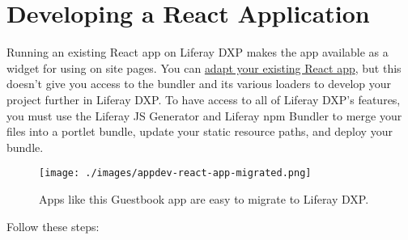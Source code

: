 \chapter{Developing a React
Application}\label{developing-a-react-application}

Running an existing React app on Liferay DXP makes the app available as
a widget for using on site pages. You can
\href{/docs/7-2/reference/-/knowledge_base/r/adapting-existing-apps-to-run-on-product}{adapt
your existing React app}, but this doesn't give you access to the
bundler and its various loaders to develop your project further in
Liferay DXP. To have access to all of Liferay DXP's features, you must
use the Liferay JS Generator and Liferay npm Bundler to merge your files
into a portlet bundle, update your static resource paths, and deploy
your bundle.

\begin{figure}
\centering
\texttt{[image: ./images/appdev-react-app-migrated.png]}
\caption{Apps like this Guestbook app are easy to migrate to Liferay
DXP.}
\end{figure}

Follow these steps:

